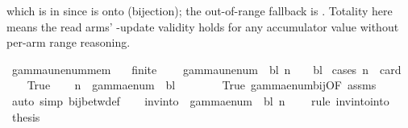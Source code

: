 \begin{isabellebody}
\begin{isamarkuptext}
  which is in \isa{{\isasymGamma}} since  is onto
   (bijection); the out-of-range fallback is
  .  Totality here means the read arms' -update
  validity holds for any accumulator value without per-arm range
  reasoning.%
\end{isamarkuptext}\isamarkuptrue%
\isamarkupfalse%
\ gamma{\isacharunderscore}{\kern0pt}unenum{\isacharunderscore}{\kern0pt}mem{\isacharcolon}{\kern0pt}\isanewline
\ \ \ {\isachardoublequoteopen}finite\ {\isasymGamma}{\isachardoublequoteclose}\isanewline
\ \ \ {\isachardoublequoteopen}gamma{\isacharunderscore}{\kern0pt}unenum\ {\isasymGamma}\ bl\ n\ {\isasymin}\ {\isasymGamma}\ {\isasymunion}\ {\isacharbraceleft}{\kern0pt}bl{\isacharbraceright}{\kern0pt}{\isachardoublequoteclose}\isanewline
%
\isadelimproof
%
\endisadelimproof
%
\isatagproof
{}\isamarkupfalse%
\ {\isacharparenleft}{\kern0pt}cases\ {\isachardoublequoteopen}n\ {\isacharless}{\kern0pt}\ card\ {\isasymGamma}{\isachardoublequoteclose}{\isacharparenright}{\kern0pt}\isanewline
\ \ \isamarkupfalse%
\ True\isanewline
\ \ \isamarkupfalse%
\ {\isachardoublequoteopen}n\ {\isasymin}\ gamma{\isacharunderscore}{\kern0pt}enum\ {\isasymGamma}\ bl\ {\isacharbackquote}{\kern0pt}\ {\isasymGamma}{\isachardoublequoteclose}\isanewline
\ \ \ \ \isamarkupfalse%
\ True\ gamma{\isacharunderscore}{\kern0pt}enum{\isacharunderscore}{\kern0pt}bij{\isacharbrackleft}{\kern0pt}OF\ assms{\isacharbrackright}{\kern0pt}\ \isamarkupfalse%
\ {\isacharparenleft}{\kern0pt}auto\ simp{\isacharcolon}{\kern0pt}\ bij{\isacharunderscore}{\kern0pt}betw{\isacharunderscore}{\kern0pt}def{\isacharparenright}{\kern0pt}\isanewline
\ \ \isamarkupfalse%
\ {\isachardoublequoteopen}inv{\isacharunderscore}{\kern0pt}into\ {\isasymGamma}\ {\isacharparenleft}{\kern0pt}gamma{\isacharunderscore}{\kern0pt}enum\ {\isasymGamma}\ bl{\isacharparenright}{\kern0pt}\ n\ {\isasymin}\ {\isasymGamma}{\isachardoublequoteclose}\ \isamarkupfalse%
\ {\isacharparenleft}{\kern0pt}rule\ inv{\isacharunderscore}{\kern0pt}into{\isacharunderscore}{\kern0pt}into{\isacharparenright}{\kern0pt}\isanewline
\ \ \isamarkupfalse%
\ {\isacharquery}{\kern0pt}thesis\ \isamarkupfalse%

\end{isabellebody}
